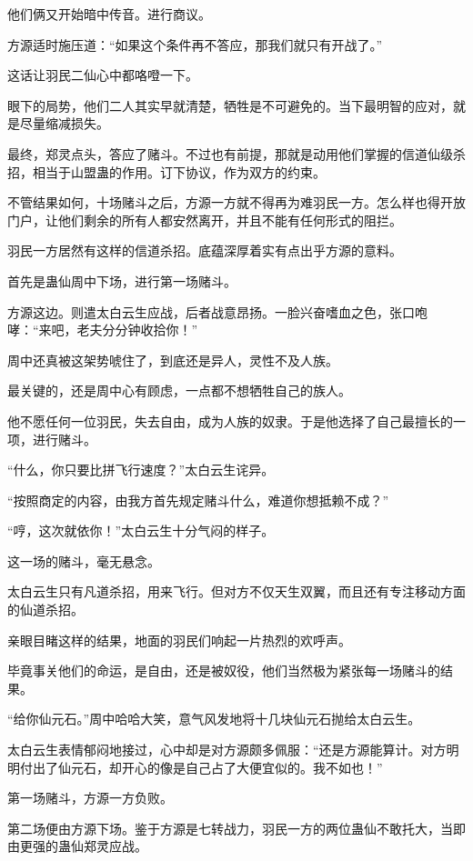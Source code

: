 \begin{this_body}
他们俩又开始暗中传音。进行商议。

方源适时施压道：“如果这个条件再不答应，那我们就只有开战了。”

这话让羽民二仙心中都咯噔一下。

眼下的局势，他们二人其实早就清楚，牺牲是不可避免的。当下最明智的应对，就是尽量缩减损失。

最终，郑灵点头，答应了赌斗。不过也有前提，那就是动用他们掌握的信道仙级杀招，相当于山盟蛊的作用。订下协议，作为双方的约束。

不管结果如何，十场赌斗之后，方源一方就不得再为难羽民一方。怎么样也得开放门户，让他们剩余的所有人都安然离开，并且不能有任何形式的阻拦。

羽民一方居然有这样的信道杀招。底蕴深厚着实有点出乎方源的意料。

首先是蛊仙周中下场，进行第一场赌斗。

方源这边。则遣太白云生应战，后者战意昂扬。一脸兴奋嗜血之色，张口咆哮：“来吧，老夫分分钟收拾你！”

周中还真被这架势唬住了，到底还是异人，灵性不及人族。

最关键的，还是周中心有顾虑，一点都不想牺牲自己的族人。

他不愿任何一位羽民，失去自由，成为人族的奴隶。于是他选择了自己最擅长的一项，进行赌斗。

“什么，你只要比拼飞行速度？”太白云生诧异。

“按照商定的内容，由我方首先规定赌斗什么，难道你想抵赖不成？”

“哼，这次就依你！”太白云生十分气闷的样子。

这一场的赌斗，毫无悬念。

太白云生只有凡道杀招，用来飞行。但对方不仅天生双翼，而且还有专注移动方面的仙道杀招。

亲眼目睹这样的结果，地面的羽民们响起一片热烈的欢呼声。

毕竟事关他们的命运，是自由，还是被奴役，他们当然极为紧张每一场赌斗的结果。

“给你仙元石。”周中哈哈大笑，意气风发地将十几块仙元石抛给太白云生。

太白云生表情郁闷地接过，心中却是对方源颇多佩服：“还是方源能算计。对方明明付出了仙元石，却开心的像是自己占了大便宜似的。我不如也！”

第一场赌斗，方源一方负败。

第二场便由方源下场。鉴于方源是七转战力，羽民一方的两位蛊仙不敢托大，当即由更强的蛊仙郑灵应战。


\end{this_body}

